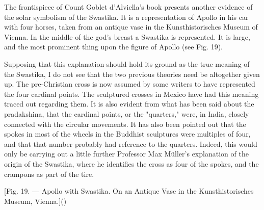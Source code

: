 \documentclass[a4paper, 11pt, oneside, polutonikogreek, english]{article}
\begin{document}
The frontispiece of Count Goblet d'Alviella's book presents another evidence of the solar symbolism of the Swastika. It is a representation of Apollo in his car with four horses, taken from an antique vase in the Kunsthistorisches Museum of Vienna. In the middle of the god's breast a Swastika is represented. It is large, and the most prominent thing upon the figure of Apollo (see Fig. 19).

Supposing that this explanation should hold its ground as the true meaning of the Swastika, I do not see that the two previous theories need be altogether given up. The pre-Christian cross is now assumed by some writers to have represented the four cardinal points. The sculptured crosses in Mexico have had this meaning traced out regarding them. It is also evident from what has been said about the pradakshina, that the cardinal points, or the "quarters," were, in India, closely connected with the circular movements. It has also been pointed out that the spokes in most of the wheels in the Buddhist sculptures were multiples of four, and that that number probably had reference to the quarters. Indeed, this would only be carrying out a little further Professor Max Müller's explanation of the origin of the Swastika, where he identifies the cross as four of the spokes, and the crampons as part of the tire.

[Fig. 19. --- Apollo with Swastika. On an Antique Vase in the Kunsthistorisches Museum, Vienna.]()
\end{document}
